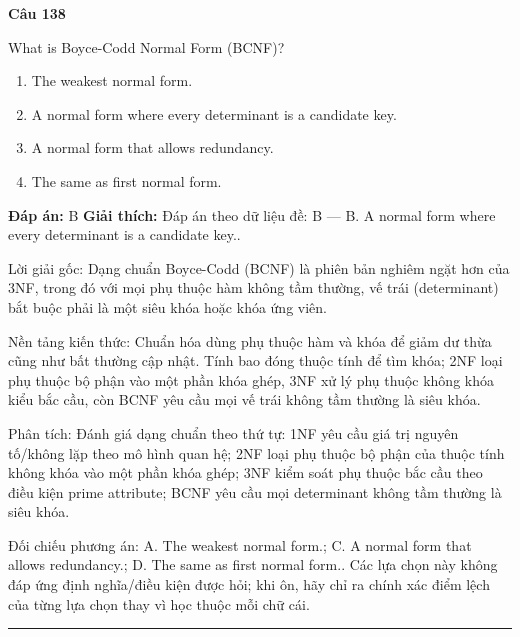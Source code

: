 \documentclass[11pt,a4paper]{article}
\newenvironment{question}[1]{%
  \par\vspace{1em}\noindent\textbf{\large Câu #1}\par\vspace{0.4em}
}{%
  \par\vspace{1em}\hrule\vspace{0.6em}
}
\newenvironment{choices}{%
  \begin{enumerate}[label=\textbf{\Alph*.},leftmargin=2.2em,itemsep=2pt,topsep=3pt]
}{%
  \end{enumerate}
}
\newcommand{\choice}{\item}
\begin{document}
\begin{question}{138}
What is Boyce-Codd Normal Form (BCNF)?
\begin{choices}
\choice The weakest normal form.
\choice A normal form where every determinant is a candidate key.
\choice A normal form that allows redundancy.
\choice The same as first normal form.
\end{choices}
\textbf{Đáp án:} B
\textbf{Giải thích:} Đáp án theo dữ liệu đề: B — B. A normal form where every determinant is a candidate key..

Lời giải gốc: Dạng chuẩn Boyce-Codd (BCNF) là phiên bản nghiêm ngặt hơn của 3NF, trong đó với mọi phụ thuộc hàm không tầm thường, vế trái (determinant) bắt buộc phải là một siêu khóa hoặc khóa ứng viên.

Nền tảng kiến thức: Chuẩn hóa dùng phụ thuộc hàm và khóa để giảm dư thừa cũng như bất thường cập nhật. Tính bao đóng thuộc tính để tìm khóa; 2NF loại phụ thuộc bộ phận vào một phần khóa ghép, 3NF xử lý phụ thuộc không khóa kiểu bắc cầu, còn BCNF yêu cầu mọi vế trái không tầm thường là siêu khóa.

Phân tích: Đánh giá dạng chuẩn theo thứ tự: 1NF yêu cầu giá trị nguyên tố/không lặp theo mô hình quan hệ; 2NF loại phụ thuộc bộ phận của thuộc tính không khóa vào một phần khóa ghép; 3NF kiểm soát phụ thuộc bắc cầu theo điều kiện prime attribute; BCNF yêu cầu mọi determinant không tầm thường là siêu khóa.

Đối chiếu phương án: A. The weakest normal form.; C. A normal form that allows redundancy.; D. The same as first normal form.. Các lựa chọn này không đáp ứng định nghĩa/điều kiện được hỏi; khi ôn, hãy chỉ ra chính xác điểm lệch của từng lựa chọn thay vì học thuộc mỗi chữ cái.
\end{question}
\end{document}
